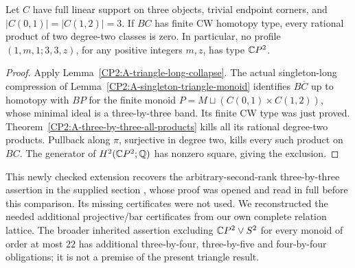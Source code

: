\begin{corollary}
\label{CP2:A-three-three-triangles}
Let $C$ have full linear support on three objects, trivial
endpoint corners, and $|C(0,1)|=|C(1,2)|=3$. If $BC$ has
finite CW homotopy type, every rational product of two
degree-two classes is zero. In particular, no profile
$(1,m,1;3,3,z)$, for any positive integers $m,z$, has type
$\mathbb{C}P^2$.
\end{corollary}
\begin{proof}
Apply Lemma~\ref{CP2:A-triangle-long-collapse}. The actual
singleton-long compression of
Lemma~\ref{CP2:A-singleton-triangle-monoid} identifies
$B\overline C$ up to homotopy with $BP$ for the finite
monoid $P=M\sqcup(C(0,1)\times C(1,2))$, whose minimal
ideal is a three-by-three band. Its finite CW type was
just proved. Theorem~\ref{CP2:A-three-by-three-all-products}
kills all its rational degree-two products. Pullback along
$\pi$, surjective in degree two, kills every such product
on $BC$. The generator of $H^2(\mathbb{C}P^2;\mathbb Q)$ has
nonzero square, giving the exclusion.
\end{proof}

\begin{remark*}
This newly checked extension recovers the arbitrary-second-rank
three-by-three assertion in the supplied section
, whose
proof was opened and read in full before this comparison.
Its missing certificates were not used. We reconstructed the
needed additional projective/bar certificates from our own
complete relation lattice. The broader inherited assertion
excluding $\mathbb{C}P^2\vee S^2$ for every monoid of order at most
$22$ has additional three-by-four, three-by-five and
four-by-four obligations; it is not a premise of the present
triangle result.
\end{remark*}
